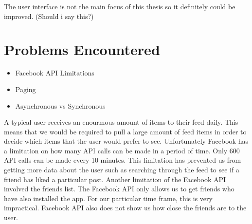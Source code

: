 The user interface is not the main focus of this thesis so it definitely could be improved. (Should i say this?)

\section{Problems Encountered}

\begin{itemize}
  	\item Facebook API Limitations
	\item Paging
	\item Asynchronous vs Synchronous
\end{itemize}

A typical user receives an enourmous amount of items to their feed daily. This means that we would be required to pull a large amount of feed items in order to decide which items that the user would prefer to see. Unfortunately Facebook has a limitation on how many API calls can be made in a period of time. Only 600 API calls can be made every 10 minutes. This limitation has prevented us from getting more data about the user such as searching through the feed to see if a friend has liked a particular post. Another limitation of the Facebook API involved the friends list. The Facebook API only allows us to get friends who have also installed the app. For our particular time frame, this is very impractical. Facebook API also does not show us how close the friends are to the user.  

